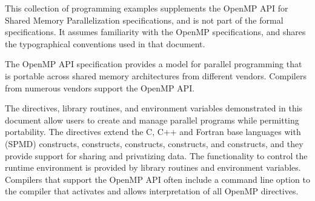 %
%
%
%
%
%
%
%
%
%

\label{chap:introduction}

This collection of programming examples supplements the OpenMP API for Shared
Memory Parallelization specifications, and is not part of the formal specifications. It
assumes familiarity with the OpenMP specifications, and shares the typographical
conventions used in that document.

The OpenMP API specification provides a model for parallel programming that is
portable across shared memory architectures from different vendors. Compilers from
numerous vendors support the OpenMP API.

The directives, library routines, and environment variables demonstrated in this
document allow users to create and manage parallel programs while permitting
portability. The directives extend the C, C++ and Fortran base languages with  (SPMD) constructs,  constructs,  constructs,
 constructs, and  constructs, and they provide support for
sharing and privatizing data. The functionality to control the runtime environment is
provided by library routines and environment variables. Compilers that support the
OpenMP API often include a command line option to the compiler that activates and
allows interpretation of all OpenMP directives.

